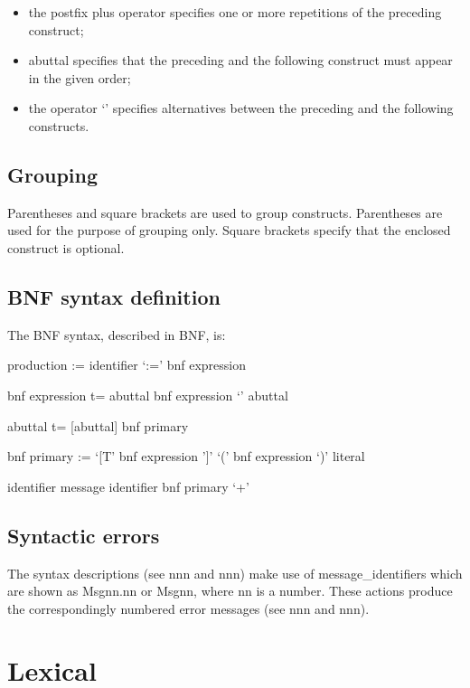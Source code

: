 \begin{itemize}
\item
  the postfix plus operator specifies one or more repetitions of the
  preceding construct;
\item
  abuttal specifies that the preceding and the following construct must
  appear in the given order;
\item
  the operator `\textbar{}' specifies alternatives between the preceding
  and the following constructs.
\end{itemize}

\subsection{Grouping}\label{grouping}

Parentheses and square brackets are used to group constructs.
Parentheses are used for the purpose of grouping only. Square brackets
specify that the enclosed construct is optional.

\subsection{BNF syntax definition}\label{bnf-syntax-definition}

The BNF syntax, described in BNF, is:

production := identifier `:=' bnf expression

bnf expression t= abuttal \textbar{} bnf expression `\textbar{}' abuttal

abuttal t= {[}abuttal{]} bnf primary

bnf primary := `{[}T' bnf expression '{]}' \textbar{} `(' bnf expression
`)' \textbar{} literal \textbar{}

identifier \textbar{} message identifier \textbar{} bnf primary `+'

\subsection{Syntactic errors}\label{syntactic-errors}

The syntax descriptions (see nnn and nnn) make use of
message\_identifiers which are shown as Msgnn.nn or Msgnn, where nn is a
number. These actions produce the correspondingly numbered error
messages (see nnn and nnn).

\section{Lexical}\label{lexical}

